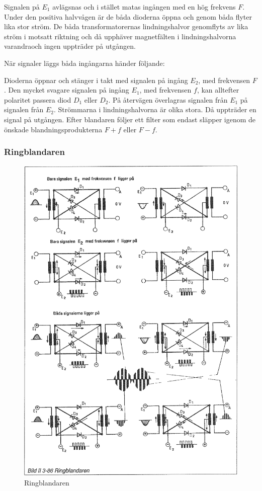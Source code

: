 Signalen på \(E_1\) avlägsnas och i stället matas ingången med en hög
frekvens \(F\). Under den positiva halvvågen är de båda dioderna öppna
och genom båda flyter lika stor ström. De båda transformatorernas
lindningshalvor genomflyts av lika ström i motsatt riktning och då
upphäver magnetfälten i lindningshalvorna varandraoch ingen uppträder
på utgången.

När signaler läggs båda ingångarna händer följande:

Dioderna öppnar och stänger i takt med signalen på ingång \(E_2\), med
frekvensen \(F\). Den mycket svagare signalen på ingång \(E_1\), med
frekvensen \(f\), kan alltefter polaritet passera diod \(D_1\) eller
\(D_2\). På återvägen överlagras signalen från \(E_1\) på signalen
från \(E_2\). Strömmarna i lindningshalvorna är olika stora. Då
uppträder en signal på utgången.  Efter blandaren följer ett filter
som endast släpper igenom de önskade blandningsprodukterna \(F + f\)
eller \(F - f\).

\subsubsection{Ringblandaren}

\begin{figure}
\includegraphics[width=\textwidth]{images/bild_2_3-86}
\caption{Ringblandaren}
\label{fig:BildII3-86}
\end{figure}


